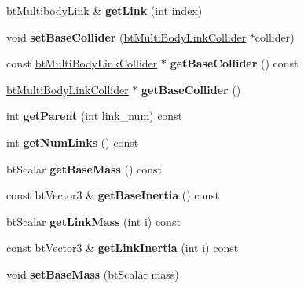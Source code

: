 \begin{DoxyCompactItemize}
\hyperlink{structbtMultibodyLink}{bt\+Multibody\+Link} \& {\bfseries get\+Link} (int index)
\item 
\mbox{\label{classbtMultiBody_afe617a7ba5ab8538212ed9019721ee34}} 
void {\bfseries set\+Base\+Collider} (\hyperlink{classbtMultiBodyLinkCollider}{bt\+Multi\+Body\+Link\+Collider} $\ast$collider)
\item 
\mbox{\label{classbtMultiBody_ac4572e67ecbf703363dc6f0216255799}} 
const \hyperlink{classbtMultiBodyLinkCollider}{bt\+Multi\+Body\+Link\+Collider} $\ast$ {\bfseries get\+Base\+Collider} () const
\item 
\mbox{\label{classbtMultiBody_a8553158acf5059cba677db783dc03ecd}} 
\hyperlink{classbtMultiBodyLinkCollider}{bt\+Multi\+Body\+Link\+Collider} $\ast$ {\bfseries get\+Base\+Collider} ()
\item 
\mbox{\label{classbtMultiBody_a898364731e99c7c24b9be8c92806f775}} 
int {\bfseries get\+Parent} (int link\+\_\+num) const
\item 
\mbox{\label{classbtMultiBody_a5d1e7ab2bfb03be026ab42d8ad53ec8f}} 
int {\bfseries get\+Num\+Links} () const
\item 
\mbox{\label{classbtMultiBody_acc628f4906d360d7b09caa0a5d6e4ee9}} 
bt\+Scalar {\bfseries get\+Base\+Mass} () const
\item 
\mbox{\label{classbtMultiBody_ab4977e6b92d827181e692f40b5b369b4}} 
const bt\+Vector3 \& {\bfseries get\+Base\+Inertia} () const
\item 
\mbox{\label{classbtMultiBody_a78329f2e10efd268859ee7678399371a}} 
bt\+Scalar {\bfseries get\+Link\+Mass} (int i) const
\item 
\mbox{\label{classbtMultiBody_a3c3dfec0a4426f3ba0c92f5017621361}} 
const bt\+Vector3 \& {\bfseries get\+Link\+Inertia} (int i) const
\item 
\mbox{\label{classbtMultiBody_a39b17484fc121b0ec1f859e0f50e7552}} 
void {\bfseries set\+Base\+Mass} (bt\+Scalar mass)

\end{DoxyCompactItemize}
